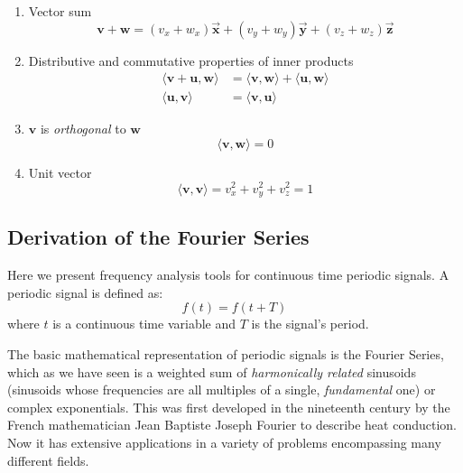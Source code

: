 \begin{enumerate}
\item Vector sum
\begin{equation}
\mathbf{v} + \mathbf{w} = 
    (v_x+w_x)\vec{\mathbf{x}}
  + (v_y+w_y)\vec{\mathbf{y}}
  + (v_z+w_z)\vec{\mathbf{z}}
 \label{eq:vec-sum}
\end{equation}
\item Distributive and commutative properties of inner products
\begin{align}
\langle\mathbf{v} +\mathbf{u} , \mathbf{w}\rangle &=
   \langle\mathbf{v},\mathbf{w}\rangle + \langle\mathbf{u}, \mathbf{w}\rangle
 \label{eq:ip-dist}\\
\langle\mathbf{u}, \mathbf{v}\rangle &= \langle\mathbf{v}, \mathbf{u}\rangle
 \label{eq:ip-commut}
\end{align}
\item $\mathbf{v}$ is \emph{orthogonal} to $\mathbf{w}$
\begin{equation}
\langle\mathbf{v}, \mathbf{w}\rangle = 0 \label{eq:orthogonal}
\end{equation}
\item Unit vector
\begin{equation}
\langle\mathbf{v}, \mathbf{v}\rangle = v_x^2 +  v_y^2 + v_z^2 =1
 \label{eq:unit-vector}
\end{equation}
\end{enumerate}

\subsection{Derivation of the Fourier Series}

Here we present frequency analysis tools for continuous time periodic
signals. A periodic signal is defined as: 
\begin{equation}
f(t) = f(t+T)
\end{equation}
where $t$ is a continuous time variable and $T$ is the signal's
period.

The basic mathematical representation of periodic signals is the
Fourier Series, which as we have seen is a weighted sum of
\emph{harmonically related} sinusoids (sinusoids whose frequencies are
all multiples of a single,
\emph{fundamental} one) or complex exponentials. This was first
developed in the nineteenth century by the French mathematician Jean
Baptiste Joseph Fourier to describe heat conduction. Now it has
extensive applications in a variety of problems encompassing many
different fields.

